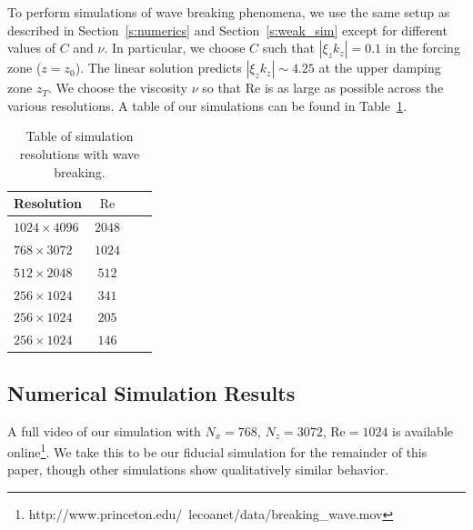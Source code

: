 \documentclass[
        fleqn,
        usenatbib,
        referee,
    ]{mnras}
\newcommand*{\abs}[1]{\left|#1\right|}
\begin{document}

To perform simulations of wave breaking phenomena, we use the same setup as
described in Section~\ref{s:numerics} and Section~\ref{s:weak_sim} except for
different values of $C$ and $\nu$. In particular, we choose $C$ such that
$\abs{\xi_z k_z} = 0.1$ in the forcing zone ($z = z_0$). The linear solution
predicts $\abs{\xi_z k_z} \sim 4.25$ at the upper damping zone $z_T$. We choose
the viscosity $\nu$ so that $\mathrm{Re}$ is as large as possible across the
various resolutions. A table of our simulations can be found in
Table~\ref{tab:params}.
\begin{table}
    \centering
    \begin{tabular}{l c c c}
        Resolution & $\mathrm{Re}$\\\bottomrule
        $1024 \times 4096$ & $2048$\\
        $768 \times 3072$ & $1024$\\
        $512 \times 2048$ & $512$\\
        $256 \times 1024$ & $341$\\
        $256 \times 1024$ & $205$\\
        $256 \times 1024$ & $146$\\
    \end{tabular}
    \caption{Table of simulation resolutions with wave
    breaking.}\label{tab:params}
\end{table}

\subsection{Numerical Simulation Results}\label{ss:nl_ns}

A full video of our simulation with $N_x = 768$, $N_z = 3072$, $\mathrm{Re} =
1024$ is available
online\footnote{http://www.princeton.edu/~lecoanet/data/breaking\_wave.mov}. We
take this to be our fiducial simulation for the remainder of this paper, though
other simulations show qualitatively similar behavior.
\end{document}

